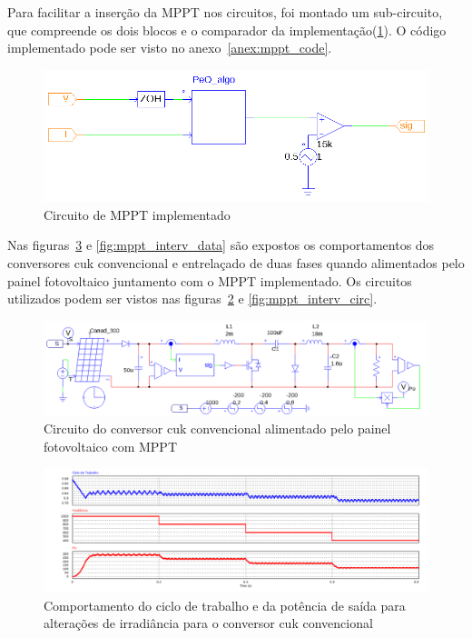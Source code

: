 \documentclass[
	12pt,				%
	openany,
	onseside,
	a4paper,			%
	english,			%
	french,				%
	spanish,			%
	brazil,				%
	]{abntex2}
\begin{document}
Para facilitar a inserção da MPPT nos circuitos, foi montado um sub-circuito, que compreende os dois blocos e o comparador da implementação(\ref{fig:mppt_subcircuit}). O código implementado pode ser visto no anexo~\ref{anex:mppt_code}.

\begin{figure}[htb]%
	\begin{center}%
		\includegraphics[width=0.85 \linewidth]{mppt_psim_circ}
		\caption{Circuito de MPPT implementado}
		\label{fig:mppt_subcircuit}
	\end{center}
\end{figure}

Nas figuras~\ref{fig:mppt_conv_data} e \ref{fig:mppt_interv_data} são expostos os comportamentos dos conversores cuk convencional e entrelaçado de duas fases quando alimentados pelo painel fotovoltaico juntamento com o MPPT implementado. Os circuitos utilizados podem ser vistos nas figuras~\ref{fig:mppt_conv_circ} e \ref{fig:mppt_interv_circ}.

\begin{figure}[htb]%
	\captionsetup{justification=centering}%
	\begin{center}%
		\includegraphics[width= \linewidth]{mppt_conv_circ}
		\caption{Circuito do conversor cuk convencional alimentado pelo painel fotovoltaico com MPPT}
		\label{fig:mppt_conv_circ}
	\end{center}
\end{figure}

\begin{figure}[htb]%
	\captionsetup{justification=centering}%
	\begin{center}%
		\includegraphics[width= \textwidth]{mppt_conv_data}
		\caption{Comportamento do ciclo de trabalho e da potência de saída para alterações de irradiância para o conversor cuk convencional}
		\label{fig:mppt_conv_data}
	\end{center}
\end{figure}
\end{document}
